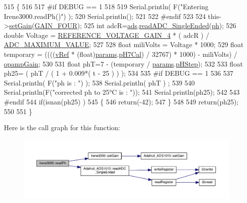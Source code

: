 \begin{DoxyCode}
515 \{
516 
517 \textcolor{preprocessor}{#if DEBUG == 1 }
518 
519     Serial.println( F(\textcolor{stringliteral}{"Entering Irene3000.readPh()"}) );
520     Serial.println();
521 
522 \textcolor{preprocessor}{#endif }
523 
524     this->\hyperlink{class_irene3000_aff7c5da186b388e7272e63ff88a20c34}{setGain}(\hyperlink{_cool_adafruit___a_d_s1015_8h_a3d6c0e15829a207b9155890811fa4781a33fa5521f4e806b7438052fcdbbf8660}{GAIN\_FOUR});
525     \textcolor{keywordtype}{int} adcR=\hyperlink{class_irene3000_a1215e77ba761c9908d80d691f149e135}{ads}.\hyperlink{class_adafruit___a_d_s1015_a40f38b9e1f3ec397c0670dd632510235}{readADC\_SingleEnded}(\hyperlink{_irene3000_8h_af771ceafe0e6524dd8497d4305dfe778}{ph});
526     \textcolor{keywordtype}{double} Voltage =  \hyperlink{_irene3000_8h_a51af1d267f8d2e05eff1e4f5c88d02e5}{REFERENCE\_VOLTAGE\_GAIN\_4} * ( adcR ) / 
      \hyperlink{_irene3000_8h_ae04444a85a37b5dce09107f2ce2b2c80}{ADC\_MAXIMUM\_VALUE};
527 
528     \textcolor{keywordtype}{float} miliVolts = Voltage * 1000;
529     \textcolor{keywordtype}{float} temporary = ((((\hyperlink{class_irene3000_a018e7ff9bee57e6d2b298667a668ba7e}{vRef} * (float)\hyperlink{class_irene3000_a136585a5ee7f9ac6ab52175fa153f8e3}{params}.\hyperlink{struct_irene3000_1_1parameters___t_a21265466a570d84bff914f26d2f7a03e}{pH7Cal}) / 32767) * 1000) - miliVolts) / 
      \hyperlink{class_irene3000_a4e588985ca74e5076029d5dee81034f2}{opampGain};
530     
531     \textcolor{keywordtype}{float} phT=7 - (temporary / \hyperlink{class_irene3000_a136585a5ee7f9ac6ab52175fa153f8e3}{params}.\hyperlink{struct_irene3000_1_1parameters___t_a61cfcc2539d5f630e9071f3753aba9fe}{pHStep});
532 
533     \textcolor{keywordtype}{float} ph25= ( phT / ( 1 + 0.009*( t - 25 ) ) );
534 
535 \textcolor{preprocessor}{#if DEBUG == 1 }
536 
537     Serial.println( F(\textcolor{stringliteral}{"ph is : "}) );
538     Serial.println( phT ) ;
539     
540     Serial.println(F(\textcolor{stringliteral}{"corrected ph to 25°C is : "}));
541     Serial.println(ph25);
542 
543 \textcolor{preprocessor}{#endif }
544     \textcolor{keywordflow}{if}(isnan(ph25) )
545     \{
546         \textcolor{keywordflow}{return}(-42);    
547     \}
548 
549     \textcolor{keywordflow}{return}(ph25);
550 
551 \}
\end{DoxyCode}
Here is the call graph for this function\+:\nopagebreak
\begin{figure}[H]
\begin{center}
\leavevmode
\includegraphics[width=350pt]{d6/d03/class_irene3000_a436fc0a06681cd0784aba56b9707f19a_cgraph}
\end{center}
\end{figure}
